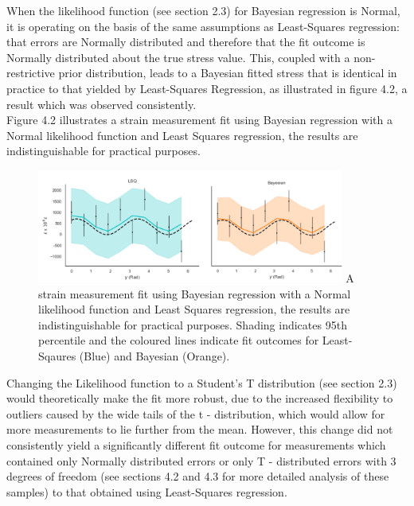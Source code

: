 When the likelihood function (see section 2.3) for Bayesian regression is Normal, it is operating on the basis of the same assumptions as Least-Squares regression: that errors are Normally distributed and therefore that the fit outcome is Normally distributed about the true stress value.\cite{a2017_bayesian} This, coupled with a non-restrictive prior distribution, leads to a Bayesian fitted stress that is identical in practice to that yielded by Least-Squares Regression, as illustrated in figure 4.2, a result which was observed consistently. \\

Figure 4.2 illustrates a strain measurement fit using Bayesian regression with a Normal likelihood function and Least Squares regression, the results are indistinguishable for practical purposes.\\

\begin{figure}[h]
 	\centering
 	\includegraphics[width=0.9\textwidth]{chapters/chapter03/fig03/samefit.png}
 	\mycaption
 	{A strain measurement fit using Bayesian regression with a Normal likelihood function and Least Squares regression, the results are indistinguishable for practical purposes. Shading indicates 95th percentile and the coloured lines indicate fit outcomes for Least-Sqaures (Blue) and Bayesian (Orange).}
    \label{fig:RHP02}
 \end{figure}

Changing the Likelihood function to a Student's T distribution (see section 2.3) would theoretically make the fit more robust, due to the increased flexibility to outliers caused by the wide tails of the t - distribution, which would allow for more measurements to lie further from the mean. However, this change did not consistently yield a significantly different fit outcome for measurements which contained only Normally distributed errors or only T - distributed errors with 3 degrees of freedom (see sections 4.2 and 4.3 for more detailed analysis of these samples) to that obtained using Least-Squares regression. \\

